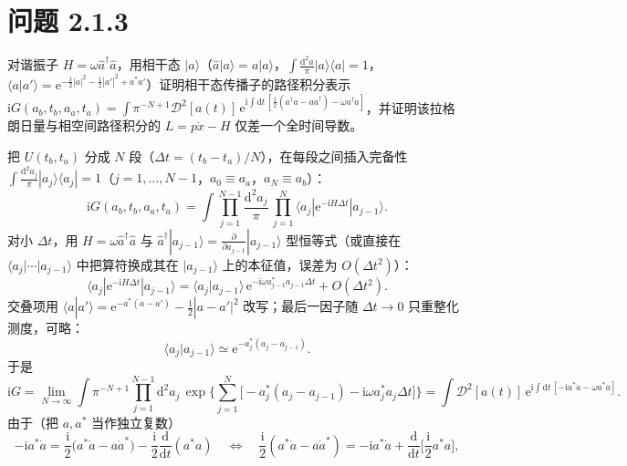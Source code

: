 \section*{问题 2.1.3}
\begin{problem}
对谐振子 $H=\omega\hat a^\dagger\hat a$，用相干态 $|a\rangle$（$\hat a|a\rangle=a|a\rangle$，$\int\frac{\mathrm{d}^2a}{\pi}|a\rangle\langle a|=1$，$\langle a|a'\rangle=\mathrm{e}^{-\frac12|a|^2-\frac12|a'|^2+a^*a'}$）证明相干态传播子的路径积分表示
$\mathrm{i}G(a_b,t_b,a_a,t_a)=\int\pi^{-N+1}\mathcal D^2[a(t)]\,\mathrm{e}^{\mathrm{i}\int\mathrm{d}t\,[\frac{\mathrm{i}}{2}(a^\dagger\dot a-a\dot a^\dagger)-\omega a^\dagger a]}$，并证明该拉格朗日量与相空间路径积分的 $L=p\dot x-H$ 仅差一个全时间导数。
\end{problem}
\solution
把 $U(t_b,t_a)$ 分成 $N$ 段（$\Delta t=(t_b-t_a)/N$），在每段之间插入完备性 $\int\frac{\mathrm{d}^2a_j}{\pi}|a_j\rangle\langle a_j|=1$（$j=1,\dots,N-1$，$a_0\equiv a_a$，$a_N\equiv a_b$）：
\begin{equation*}
\mathrm{i}G(a_b,t_b,a_a,t_a)=\int\prod_{j=1}^{N-1}\frac{\mathrm{d}^2a_j}{\pi}\,
\prod_{j=1}^{N}\langle a_j|\mathrm{e}^{-\mathrm{i}H\Delta t}|a_{j-1}\rangle .
\end{equation*}
对小 $\Delta t$，用 $H=\omega\hat a^\dagger\hat a$ 与 $\hat a^\dagger|a_{j-1}\rangle=\frac{\partial}{\partial a_{j-1}}|a_{j-1}\rangle$ 型恒等式（或直接在 $\langle a_j|\cdots|a_{j-1}\rangle$ 中把算符换成其在 $|a_{j-1}\rangle$ 上的本征值，误差为 $O(\Delta t^2)$）：
\begin{equation*}
\langle a_j|\mathrm{e}^{-\mathrm{i}H\Delta t}|a_{j-1}\rangle
=\langle a_j|a_{j-1}\rangle\,\mathrm{e}^{-\mathrm{i}\omega a_{j-1}^*a_{j-1}\Delta t}+O(\Delta t^2).
\end{equation*}
交叠项用 $\langle a|a'\rangle=\mathrm{e}^{-a^*(a-a')}-\frac12|a-a'|^2$ 改写；最后一因子随 $\Delta t\to0$ 只重整化测度，可略：
\begin{equation*}
\langle a_j|a_{j-1}\rangle\simeq\mathrm{e}^{-a_j^*(a_j-a_{j-1})}.
\end{equation*}
于是
\begin{equation*}
\mathrm{i}G=\lim_{N\to\infty}\int\pi^{-N+1}\prod_{j=1}^{N-1}\mathrm{d}^2a_j\,
\exp\Big\{\sum_{j=1}^{N}\Big[-a_j^*(a_j-a_{j-1})-\mathrm{i}\omega a_j^*a_j\Delta t\Big]\Big\}
=\int\mathcal D^2[a(t)]\,\mathrm{e}^{\mathrm{i}\int\mathrm{d}t\,[-\mathrm{i}a^*\dot a-\omega a^*a]} .
\end{equation*}
由于（把 $a,a^*$ 当作独立复数）
\begin{equation*}
-\mathrm{i}a^*\dot a=\frac{\mathrm{i}}{2}\big(a^*\dot a-a\dot a^*\big)-\frac{\mathrm{i}}{2}\frac{\mathrm{d}}{\mathrm{d}t}(a^*a)
\quad\Longleftrightarrow\quad
\frac{\mathrm{i}}{2}(a^*\dot a-a\dot a^*)=-\mathrm{i}a^*\dot a+\frac{\mathrm{d}}{\mathrm{d}t}\Big[\frac{\mathrm{i}}{2}a^*a\Big],
\end{equation*}
